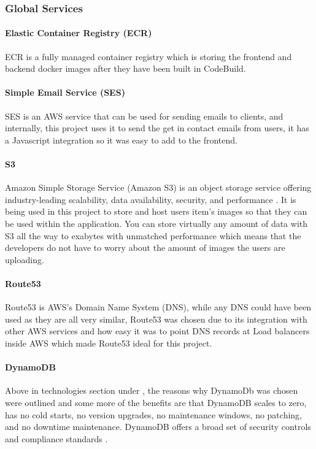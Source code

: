 \documentclass[]{project_report}
\begin{document}
\subsubsection{Global Services}

\paragraph{Elastic Container Registry (ECR)}
ECR is a fully managed container registry which is storing the frontend and backend docker images after they have been built in CodeBuild.

\paragraph{Simple Email Service (SES)}
SES is an AWS service that can be used for sending emails to clients, and internally, this project uses it to send the get in contact emails from users, it has a Javascript integration so it was easy to add to the frontend. 


\paragraph{S3}
Amazon Simple Storage Service (Amazon S3) is an object storage service offering industry-leading scalability, data availability, security, and performance \cite{aws_s3}. It is being used in this project to store and host users item's images so that they can be used within the application. You can store virtually any amount of data with S3 all the way to exabytes with unmatched performance \cite{aws_s3} which means that the developers do not have to worry about the amount of images the users are uploading.

\paragraph{Route53}
Route53 is AWS's Domain Name System (DNS), while any DNS could have been used as they are all very similar, Route53 was chosen due to its integration with other AWS services and how easy it was to point DNS records at Load balancers inside AWS which made Route53 ideal for this project.

\paragraph{DynamoDB}
Above in technologies section under  , the reasons why DynamoDb was chosen were outlined and some more of the benefits are that DynamoDB scales to zero, has no cold starts, no version upgrades, no maintenance windows, no patching, and no downtime maintenance. DynamoDB offers a broad set of security controls and compliance standards \cite{aws_dynamodb}.
\end{document}
